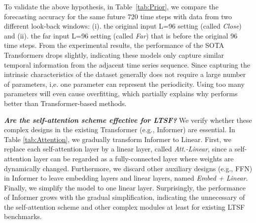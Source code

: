 To validate the above hypothesis, in Table~\ref{tab:Prior}, we compare the forecasting accuracy for the same future 720 time steps with data from two different look-back windows: (i). the original input L=96 setting (called \emph{Close}) and (ii). the far input L=96 setting (called \emph{Far}) that is before the original 96 time steps. From the experimental results, the performance of the SOTA Transformers drops slightly, indicating these models only capture similar temporal information from the adjacent time series sequence. Since capturing the intrinsic characteristics of the dataset generally does not require a large number of parameters, i,e. one parameter can represent the periodicity. Using too many parameters will even cause overfitting, which partially explains why \modelname performs better than Transformer-based methods. 



\textbf{\emph{Are the self-attention scheme effective for LTSF?}}
We verify whether these complex designs in the existing Transformer (e.g., Informer) are essential. In Table \ref{tab:Attention}, we gradually transform Informer to Linear. First, we replace each self-attention layer by a linear layer, called \emph{Att.-Linear}, since a self-attention layer can be regarded as a fully-connected layer where weights are dynamically changed.
Furthermore, we discard other auxiliary designs (e.g., FFN) in Informer to leave embedding layers and linear layers, named \emph{Embed + Linear}. Finally, we simplify the model to one linear layer. Surprisingly, the performance of Informer grows with the gradual simplification, indicating the unnecessary of the self-attention scheme and other complex modules at least for existing LTSF benchmarks. 


